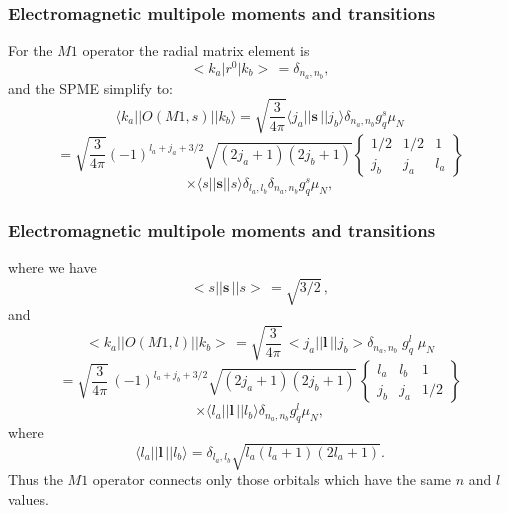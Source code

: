 \documentclass{beamer}
\begin{document}
\begin{frame}
\frametitle{Electromagnetic multipole moments and transitions}

\begin{block}{}
For the $M1$ operator the radial matrix element is
\[
<k_{a}\vert r^{0}\vert k_{b}>\, = \delta _{n_{a},n_{b}},
\]
and the SPME simplify to:
\[
\langle k_{a}\vert\vert O(M1,s)\vert\vert k_{b}\rangle=\sqrt{ \frac{3}{4\pi }}\langle j_{a}\vert\vert \mathbf{s}\,\vert\vert j_{b}\rangle \delta _{n_{a},n_{b}}g^{s}_{q}\mu_{N}
\]
\[
=\sqrt{ \frac{3}{4\pi }}(-1)^{l _{a}+j_{a}+3/2}
\sqrt{(2j_{a}+1)(2j_{b}+1)}\left\{\begin{array}{ccc}  {1/2}&  {1/2} & {1} \\ {j_{b}} & {j_{a}}&  {l _{a}}\end{array}\right\}
\]
\[
\times\langle s\vert\vert \mathbf{s}\vert\vert s\rangle \delta _{l _{a},l _{b}} \delta _{n_{a},n_{b}}g^{s}_{q}\mu _{N},
\]
\end{block}
\end{frame}

\begin{frame}
\frametitle{Electromagnetic multipole moments and transitions}

\begin{block}{}
where we have
\[
<s\vert\vert \mathbf{s}\,\vert\vert s>\, = \sqrt{3/2}\, ,
\]
and
\[
<k_{a}\vert\vert O(M1,l )\vert\vert k_{b}>\, =
\sqrt{ \frac{3}{4\pi }}\,
<j_{a}\vert\vert \mathbf{l}\,\vert\vert j_{b}> \delta _{n_{a},n_{b}} \; g^{l }_{q} \; \mu _{N}
\]
\[
=\sqrt{ \frac{3}{4\pi }}\,
(-1)^{l _{a}+j_{b}+3/2} \sqrt{(2j_{a}+1)(2j_{b}+1)}\,
   \left\{\begin{array}{ccc}  {l _{a}}&  {l _{b}} & {1}\\  {j_{b}}&  {j_{a}}&  {1/2}\end{array}\right\}
\]
\[
\times\langle l _{a}\vert\vert \mathbf{l}\,\vert\vert l _{b}\rangle \delta _{n_{a},n_{b}}g^{l }_{q}\mu _{N} ,       
\]
where
\[
\langle l _{a}\vert\vert \mathbf{l}\,\vert\vert l _{b}\rangle = \delta _{l _{a},l _{b}} \sqrt{l _{a}(l_{a}+1)(2l _{a}+1)}.
\]
Thus the $M1$ operator connects only
those orbitals which have the same $n$ and $l$ values.
\end{block}
\end{frame}
\end{document}
